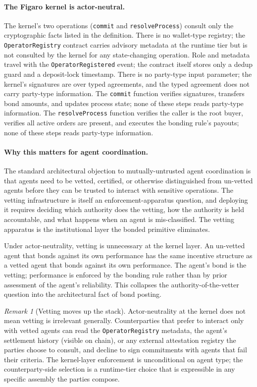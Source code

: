 \documentclass[11pt,a4paper]{article}
\theoremstyle{definition}
\theoremstyle{remark}
\newtheorem{remark}[theorem]{Remark}
\begin{document}
\paragraph{The Figaro kernel is actor-neutral.}
The kernel's two operations (\texttt{commit} and
\texttt{resolveProcess}) consult only the cryptographic facts
listed in the definition. There is no wallet-type registry; the
\texttt{OperatorRegistry} contract carries advisory metadata at the
runtime tier but is not consulted by the kernel for any
state-changing operation. Role and metadata travel with the
\texttt{OperatorRegistered} event; the contract itself stores only
a dedup guard and a deposit-lock timestamp. There is no party-type input parameter;
the kernel's signatures are over typed agreements, and the typed
agreement does not carry party-type information. The
\texttt{commit} function verifies signatures, transfers bond
amounts, and updates process state; none of these steps reads
party-type information. The \texttt{resolveProcess} function
verifies the caller is the root buyer, verifies all active orders
are present, and executes the bonding rule's payouts; none of
these steps reads party-type information.

\paragraph{Why this matters for agent coordination.}
The standard architectural objection to mutually-untrusted agent
coordination is that agents need to be vetted, certified, or
otherwise distinguished from un-vetted agents before they can be
trusted to interact with sensitive operations. The vetting
infrastructure is itself an enforcement-apparatus question, and
deploying it requires deciding which authority does the vetting,
how the authority is held accountable, and what happens when an
agent is mis-classified. The vetting apparatus is the institutional
layer the bonded primitive eliminates.

Under actor-neutrality, vetting is unnecessary at the kernel layer.
An un-vetted agent that bonds against its own performance has the
same incentive structure as a vetted agent that bonds against its
own performance. The agent's bond is the vetting; performance is
enforced by the bonding rule rather than by prior assessment of
the agent's reliability. This collapses the
authority-of-the-vetter question into the architectural fact of
bond posting.

\begin{remark}[Vetting moves up the stack]
Actor-neutrality at the kernel does not mean vetting is irrelevant
generally. Counterparties that prefer to interact only with vetted
agents can read the \texttt{OperatorRegistry} metadata, the
agent's settlement history (visible on chain), or any external
attestation registry the parties choose to consult, and decline to
sign commitments with agents that fail their criteria. The
kernel-layer enforcement is unconditional on agent type; the
counterparty-side selection is a runtime-tier choice that is
expressible in any specific assembly the parties compose.
\end{remark}
\end{document}
